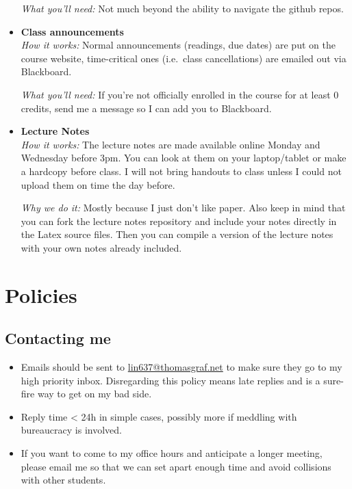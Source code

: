 \begin{itemize}
        \emph{What you'll need:}
        Not much beyond the ability to navigate the github repos.

    \item \textbf{Class announcements}\\
        \emph{How it works:}
        Normal announcements (readings, due dates) are put on the course website, time-critical ones (i.e.\ class cancellations) are emailed out via Blackboard.
        
        \emph{What you'll need:}
        If you're not officially enrolled in the course for at least 0 credits, send me a message so I can add you to Blackboard.

    \item \textbf{Lecture Notes}\\
        \emph{How it works:}
        The lecture notes are made available online Monday and Wednesday before 3pm.
        You can look at them on your laptop\slash tablet or make a hardcopy before class.
        I will not bring handouts to class unless I could not upload them on time the day before.

        \emph{Why we do it:}
        Mostly because I just don't like paper.
        Also keep in mind that you can fork the lecture notes repository and include your notes directly in the Latex source files.
        Then you can compile a version of the lecture notes with your own notes already included.
\end{itemize}


\section{Policies}

\subsection{Contacting me}
\begin{itemize}
    \item Emails should be sent to \href{mailto://lin637@thomasgraf.net}{lin637@thomasgraf.net} to make sure they go to my high priority inbox.
        Disregarding this policy means late replies and is a sure-fire way to get on my bad side.
    \item Reply time < 24h in simple cases, possibly more if meddling with bureaucracy is involved.
    \item If you want to come to my office hours and anticipate a longer meeting, please email me so that we can set apart enough time and avoid collisions with other students.
\end{itemize}


